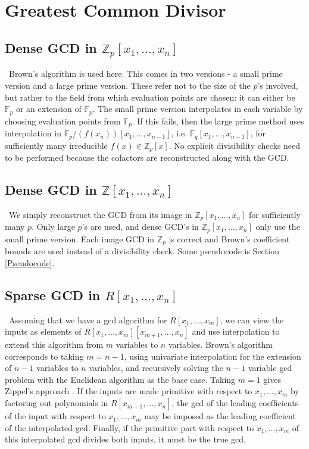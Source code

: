 \documentclass[11pt,reqno]{amsart}
\numberwithin{equation}{section}
\newcommand{\bbZ}[0]  { \mathbb{Z}}
\newcommand{\bbF}[0]  { \mathbb{F}}
\begin{document}
\section{Greatest Common Divisor}

\subsection{Dense GCD in $\bbZ_p[x_1,\dots,x_n]$}\
Brown's algorithm \cite{Brown} is used here. This comes in two versions - a
small prime version and a large prime version. These refer not to the size of
the $p$'s involved, but rather to the field from which evaluation points are
chosen: it can either be $\bbF_p$ or an extension of $\bbF_p$. The small prime 
version interpolates in each variable by choosing evaluation points from 
$\bbF_p$. If this fails, then the large prime method uses interpolation in
$\bbF_p/(f(x_n))[x_1,\dots,x_{n-1}]$, i.e. $\bbF_q[x_1,\dots,x_{n-1}]$, for
sufficiently many irreducible $f(x) \in \bbZ_p[x]$. No explicit divisibility
checks need to be performed because the cofactors are reconstructed along with 
the GCD.

\subsection{Dense GCD in $\bbZ[x_1,\dots,x_n]$}\
We simply reconstruct the GCD from its image in $\bbZ_p[x_1,\dots,x_n]$ for
sufficiently many $p$. Only large $p$'s are used, and dense GCD's in
$\bbZ_p[x_1,\dots,x_n]$ only use the small prime version. Each image GCD in
$\bbZ_p$ is correct and Brown's coefficient bounds \cite{Brown} are used
instead of a divisibility check. Some pseudocode is Section \ref{Pseudocode}.

\subsection{Sparse GCD in $R[x_1,\dots,x_n]$}\
Assuming that we have a gcd algorithm for $R[x_1,\dots,x_m]$, we can view the
inputs as elements of $R[x_1,\dots,x_m][x_{m+1},\dots,x_n]$ and use
interpolation to extend this algorithm from $m$ variables to $n$ variables.
Brown's algorithm corresponds to taking $m=n-1$, using univariate interpolation
for the extension of $n-1$ variables to $n$ variables, and recursively solving 
the $n-1$ variable gcd problem with the Euclidean algorithm as the base case.
Taking $m=1$ gives Zippel's approach \cite{ZIPPEL}.
If the inputs are made primitive with respect to $x_1,\dots,x_m$ by factoring
out polynomials in $R[x_{m+1},\dots,x_n]$, the gcd of the leading coefficients 
of the input with respect to $x_1,\dots,x_m$ may be imposed as the leading
coefficient of the interpolated gcd. Finally, if the primitive part with
respect to $x_1,\dots,x_m$ of this interpolated gcd divides both inputs, it
must be the true gcd.
\end{document}
